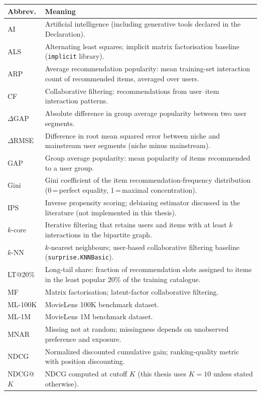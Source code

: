 \documentclass[11pt,a4paper]{report}
\begin{document}
\noindent\begin{tabularx}{\textwidth}{@{}L{0.17\textwidth}X@{}}
  \toprule
  \textbf{Abbrev.} & \textbf{Meaning} \\
  \midrule
  AI & Artificial intelligence (including generative tools declared in the Declaration). \\
  ALS & Alternating least squares; implicit matrix factorisation baseline (\texttt{implicit} library). \\
  ARP & Average recommendation popularity: mean training-set interaction count of recommended items, averaged over users. \\
  CF & Collaborative filtering: recommendations from user--item interaction patterns. \\
  $\Delta$GAP & Absolute difference in group average popularity between two user segments. \\
  $\Delta$RMSE & Difference in root mean squared error between niche and mainstream user segments (niche minus mainstream). \\
  GAP & Group average popularity: mean popularity of items recommended to a user group. \\
  Gini & Gini coefficient of the item recommendation-frequency distribution (0\,=\,perfect equality, 1\,=\,maximal concentration). \\
  IPS & Inverse propensity scoring; debiasing estimator discussed in the literature (not implemented in this thesis). \\
  $k$-core & Iterative filtering that retains users and items with at least $k$ interactions in the bipartite graph. \\
  $k$-NN & $k$-nearest neighbours; user-based collaborative filtering baseline (\texttt{surprise.KNNBasic}). \\
  LT@20\% & Long-tail share: fraction of recommendation slots assigned to items in the least popular 20\% of the training catalogue. \\
  MF & Matrix factorisation; latent-factor collaborative filtering. \\
  ML-100K & MovieLens 100K benchmark dataset. \\
  ML-1M & MovieLens 1M benchmark dataset. \\
  MNAR & Missing not at random; missingness depends on unobserved preference and exposure. \\
  NDCG & Normalized discounted cumulative gain; ranking-quality metric with position discounting. \\
  NDCG@$K$ & NDCG computed at cutoff $K$ (this thesis uses $K{=}10$ unless stated otherwise). \\

\end{tabularx}
\end{document}
